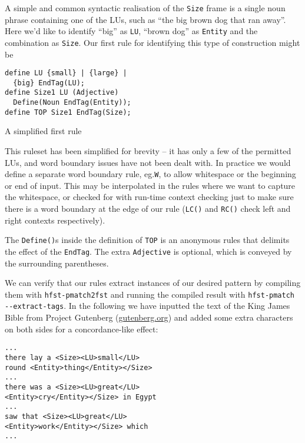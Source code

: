 \documentclass[11pt]{article}
\begin{document}
A simple and common syntactic realisation of the \verb+Size+ frame is a single
noun phrase containing one of the LUs, such as
``the big brown dog that ran away''. Here we'd like to identify ``big'' as \verb+LU+,
``brown dog'' as \verb+Entity+ and the combination as \verb+Size+.
Our first rule for identifying this type of construction might be

\begin{table}[h]
  \small
  \begin{framed}
\begin{verbatim}
define LU {small} | {large} |
  {big} EndTag(LU);
define Size1 LU (Adjective)
  Define(Noun EndTag(Entity));
define TOP Size1 EndTag(Size);  
\end{verbatim}
\end{framed}
\normalsize
\caption{A simplified first rule}
\end{table}

This ruleset has been simplified for brevity -- it has only a few of the
permitted LUs, and word boundary issues have not been dealt with. In practice
we would define a separate word boundary rule, eg.\@ \verb+W+, to allow
whitespace or the beginning or end of input. This may be interpolated in the
rules where we want to capture the whitespace, or checked for with run-time
context checking just to make sure there is a word boundary at the edge of our
rule (\verb+LC()+ and \verb+RC()+ check left and right contexts respectively).

The \verb+Define()+s inside the definition of \verb+TOP+ is an anonymous rules
that delimits the effect of the \verb+EndTag+. The extra \verb+Adjective+ is
optional, which is conveyed by the surrounding parentheses.

We can verify that our rules extract instances of our desired pattern by compiling
them with \verb+hfst-pmatch2fst+ and running the compiled result with
\verb+hfst-pmatch --extract-tags+. In the following we have
inputted the text of the King James Bible from Project
Gutenberg (\url{gutenberg.org}) and added some extra characters on both
sides for
a concordance-like effect:


  \small
  \begin{framed}
\begin{verbatim}
...
there lay a <Size><LU>small</LU>
round <Entity>thing</Entity></Size>
...
there was a <Size><LU>great</LU>
<Entity>cry</Entity></Size> in Egypt
...
saw that <Size><LU>great</LU>
<Entity>work</Entity></Size> which
...
\end{verbatim}
\end{framed}
\normalsize
\end{document}
